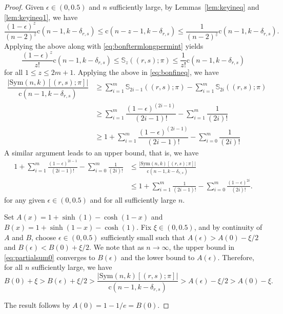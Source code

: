 \documentclass{amsart}
\newcommand{\bb}{\mathbb}
\newcommand{\sym}{\mathrm{Sym}}
\newcommand{\st}{\mathrm{c}}
\newcommand{\ff}[1]{^{\underline{#1}}}
\begin{document}
\begin{proof}
Given $\epsilon\in (0,0.5)$ and $n$ sufficiently large, by Lemmas~\ref{lem:keyineq} and \ref{lem:keyineq1}, we have 
\[\dfrac{(1-\epsilon)^{z}}{(n-2)\ff{z}} \st(n-1,k-\delta_{r,s}) \leq \st(n-z-1,k-\delta_{r,s}) \leq \dfrac{1}{(n-2)\ff{z}} \st(n-1,k-\delta_{r,s}).\]
Applying the above along with \eqref{eq:bonftermlongpermint} yields
\begin{equation}\label{eq:bonftermlongperm}
\dfrac{(1-\epsilon)^{z}}{z!}\st(n-1,k-\delta_{r,s}) \leq \bb{S}_{z}((r,s);\pi) \leq \dfrac{1}{z!}\st(n-1,k-\delta_{r,s})
\end{equation}
for all $1\leq z\leq 2m+1$.
Applying the above in \eqref{eq:bonfineq}, we have
\begin{align*}
\dfrac{|\sym(n,k)[(r,s);\pi]|}{\st(n-1,k-\delta_{r,s})} &\geq \sum\limits_{i=1}^{m} \bb{S}_{2i-1}((r,s);\pi)-\sum\limits_{i=1}^{m} \bb{S}_{2i}((r,s);\pi) \\
&\geq \sum\limits_{i=1}^{m} \dfrac{(1-\epsilon)^{(2i-1)}}{(2i-1)!} - \sum\limits_{i=1}^{m} \dfrac{1}{(2i)!}  \\
&\geq 1+\sum\limits_{i=1}^{m} \dfrac{(1-\epsilon)^{(2i-1)}}{(2i-1)!} - \sum\limits_{i=0}^{m} \dfrac{1}{(2i)!}
\end{align*}
A similar argument leads to an upper bound, that is, we have
\begin{equation}\label{eq:partialsum0}
\begin{aligned}
1+\sum_{i=1}^{m}
\frac{(1-\epsilon)^{2i-1}}{(2i-1)!}
-\sum_{i=0}^{m}\frac{1}{(2i)!}
&\leq
\frac{|\sym(n,k)[(r,s);\pi]|}
     {\st(n-1,k-\delta_{r,s})} \\
&\leq
1+\sum_{i=1}^{m}
\frac{1}{(2i-1)!}
-\sum_{i=0}^{m}
\frac{(1-\epsilon)^{2i}}{(2i)!}.
\end{aligned}
\end{equation} for any given $\epsilon \in (0,0.5)$ and for all sufficiently large $n$. 

Set $A(x)=1+\sinh(1)-\cosh(1-x)$ and $B(x)=1+ \sinh(1-x)-\cosh(1)$. Fix $\xi\in (0,0.5)$, and by continuity of $A$ and $B$, choose $\epsilon \in (0,0.5)$ sufficiently small such that 
$A(\epsilon)>A(0)-\xi/2$  and $B(\epsilon)<B(0)+\xi/2$. We note that as $n\to \infty$, the upper bound in \eqref{eq:partialsum0} converges to $B(\epsilon)$ and the lower bound to $A(\epsilon)$. Therefore, for all $n$ sufficiently large, we have
\[B(0)+\xi>B(\epsilon)+\xi/2> \dfrac{|\sym(n,k)[(r,s);\pi]|}
     {\st(n-1,k-\delta_{r,s})}>A(\epsilon)-\xi/2>A(0)-\xi.\]

The result follows by $A(0)=1-1/e=B(0)$.
\end{proof}
\end{document}
